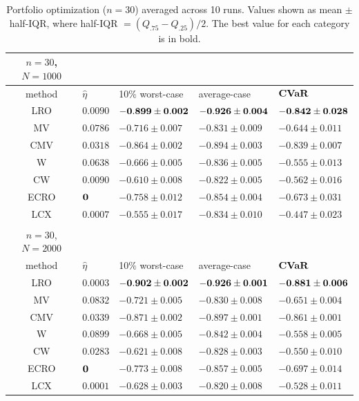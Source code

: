 \begin{table}[ht]
  \centering
  \fontsize{9}{11}\selectfont
{
	\begin{tabular}{cllll}   \toprule   
		$n=30$, $N=1000$ & & & & \\
             \midrule
		method & $\hat{\eta}$ & 10\% worst-case & average-case & $\mathop{\bf CVaR}$ \\
 \midrule
         LRO & $0.0090$ & $\bf{-0.899 \pm 0.002}$ & $\bf{-0.926 \pm 0.004}$ &$\bf{-0.842 \pm 0.028}$\\
        \midrule 
        MV & $0.0786$ & $-0.716 \pm 0.007$ & $-0.831 \pm 0.009$ &$-0.644 \pm 0.011$\\
        \midrule 
        CMV & $0.0318$ & $-0.864 \pm 0.002$ & $-0.894 \pm 0.003$ &$-0.839 \pm 0.007$\\
        \midrule 
        W & $0.0638$ & $-0.666 \pm 0.005$ & $-0.836 \pm 0.005$ &$-0.555 \pm 0.013$\\
        \midrule 
        CW & $0.0090$ & $-0.610 \pm 0.008$ & $-0.822 \pm 0.005$ &$-0.562 \pm 0.016$\\
        \midrule 
        ECRO & $\bf{0}$ & $-0.758 \pm 0.012$ & $-0.854 \pm 0.004$ &$-0.673 \pm 0.031$\\
        \midrule 
        LCX & $0.0007$ & $-0.555 \pm 0.017$ & $-0.834 \pm 0.010$ &$-0.447 \pm 0.023$\\
        \bottomrule \\[-8pt]
                \toprule 
		$n=30$, $N=2000$ & & & & \\
             \midrule
		method & $\hat{\eta}$ & 10\% worst-case & average-case & $\mathop{\bf CVaR}$ \\
 \midrule
         LRO & $0.0003$ & $\bf{-0.902 \pm 0.002}$ & $\bf{-0.926 \pm 0.001}$ &$\bf{-0.881 \pm 0.006}$\\
        \midrule 
        MV & $0.0832$ & $-0.721 \pm 0.005$ & $-0.830 \pm 0.008$ &$-0.651 \pm 0.004$\\
        \midrule 
        CMV & $0.0339$ & $-0.871 \pm 0.002$ & $-0.897 \pm 0.001$ &$-0.861 \pm 0.001$\\
        \midrule 
        W & $0.0899$ & $-0.668 \pm 0.005$ & $-0.842 \pm 0.004$ &$-0.558 \pm 0.005$\\
        \midrule 
        CW & $0.0283$ & $-0.621 \pm 0.008$ & $-0.828 \pm 0.003$ &$-0.550 \pm 0.010$\\
        \midrule 
        ECRO & $\bf{0}$ & $-0.773 \pm 0.008$ & $-0.857 \pm 0.005$ &$-0.697 \pm 0.014$\\
        \midrule 
        LCX & $0.0001$ & $-0.628 \pm 0.003$ & $-0.820 \pm 0.008$ &$-0.528 \pm 0.011$\\
 \bottomrule
		\end{tabular}}
		\caption{Portfolio optimization ($n=30$) averaged across 10 runs. Values shown as mean $\pm$ half-IQR, where half-IQR $= (Q_{.75} - Q_{.25})/2$. The best value for each category is in bold.}
		\label{table:port_n30}
        \vspace{-1em}
\end{table}
 

